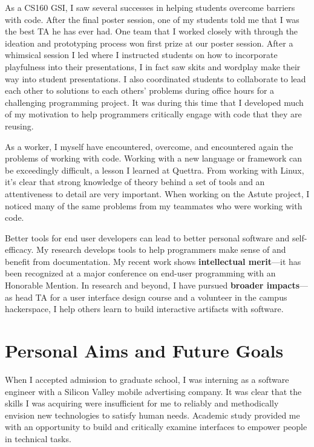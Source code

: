 \documentclass[12pt]{memoir}
\begin{document}
As a CS160 GSI, I saw several successes in helping students overcome barriers with code.
After the final poster session, one of my students told me that I was the best TA he has ever had.
One team that I worked closely with through the ideation and prototyping process won first prize at our poster session.
After a whimsical session I led where I instructed students on how to incorporate playfulness into their presentations, I in fact saw skits and wordplay make their way into student presentations.
I also coordinated students to collaborate to lead each other to solutions to each others' problems during office hours for a challenging programming project.
It was during this time that I developed much of my motivation to help programmers critically engage with code that they are reusing.

As a worker, I myself have encountered, overcome, and encountered again the problems of working with code.
Working with a new language or framework can be exceedingly difficult, a lesson I learned at Quettra.
From working with Linux, it's clear that strong knowledge of theory behind a set of tools and an attentiveness to detail are very important.
When working on the Astute project, I noticed many of the same problems from my teammates who were working with code.



Better tools for end user developers can lead to better personal software and self-efficacy.
My research develops tools to help programmers make sense of and benefit from documentation.
My recent work shows \textbf{intellectual merit}---it has been recognized at a major conference on end-user programming with an Honorable Mention.
In research and beyond, I have pursued \textbf{broader impacts}---as head TA for a user interface design course and a volunteer in the campus hackerspace, I help others learn to build interactive artifacts with software.

\section{Personal Aims and Future Goals}

When I accepted admission to graduate school, I was interning as a software engineer with a Silicon Valley mobile advertising company.
It was clear that the skills I was acquiring were insufficient for me to reliably and methodically envision new technologies to satisfy human needs.
Academic study provided me with an opportunity to build and critically examine interfaces to empower people in technical tasks.
\end{document}
